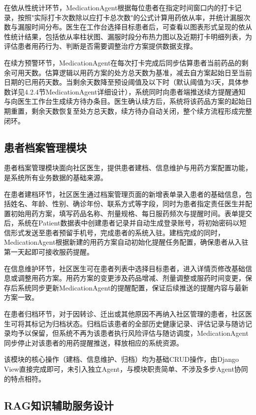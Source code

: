 在依从性统计环节，MedicationAgent根据每位患者在指定时间窗口内的打卡记录，按照"实际打卡次数除以应打卡总次数"的公式计算用药依从率，并统计漏服次数与漏服时间分布。医生在工作台选择目标患者后，可查看以图表形式呈现的依从性统计结果，包括依从率柱状图、漏服时段分布热力图以及近期打卡明细列表，为评估患者用药行为、判断是否需要调整治疗方案提供数据支撑。

在续方预警环节，MedicationAgent在每次打卡完成后同步估算患者当前药品的剩余可用天数。估算逻辑以用药方案的处方总天数为基准，减去自方案起始日至当前日期的已用药天数。当剩余天数降至预设阈值及以下时（默认阈值为3天，具体参数详见4.2.4节MedicationAgent详细设计），系统同时向患者端推送续方提醒通知与向医生工作台生成续方待办条目。医生确认续方后，系统将该药品方案的起始日期重置，剩余天数恢复至处方总天数，续方待办自动关闭，整个续方流程形成完整闭环。


\subsection{患者档案管理模块}

患者档案管理模块面向社区医生，提供患者建档、信息维护与用药方案配置功能，是系统所有业务数据的基础来源。

在患者建档环节，社区医生通过档案管理页面的新增表单录入患者的基础信息，包括姓名、年龄、性别、确诊年份、联系方式等字段，同时为患者指定责任医生并配置初始用药方案，填写药品名称、剂量规格、每日服药频次与提醒时间。表单提交后，系统在Patient数据表中创建患者记录并自动生成登录账号，将初始密码以短信形式发送至患者预留手机号，完成患者的系统入驻。建档完成的同时，MedicationAgent根据新建的用药方案自动初始化提醒任务配置，确保患者从入驻第一天起即可接收服药提醒。

在信息维护环节，社区医生可在患者列表中选择目标患者，进入详情页修改基础信息或调整用药方案。用药方案的变更涉及药品增减、剂量调整或服药时间变更，保存后系统同步更新MedicationAgent的提醒配置，保证后续推送的提醒内容与最新方案一致。

在患者归档环节，对于因转诊、迁出或其他原因不再纳入社区管理的患者，社区医生可将其标记为归档状态。归档后该患者的全部历史健康记录、评估记录与随访记录均予以保留，但系统不再为该患者执行风险评估与随访调度，MedicationAgent同步停止对该患者的用药提醒推送，释放相应的系统资源。

该模块的核心操作（建档、信息维护、归档）均为基础CRUD操作，由Django View直接完成即可，未引入独立Agent，与模块职责简单、不涉及多步Agent协同的特点相符。


\subsection{RAG知识辅助服务设计}

